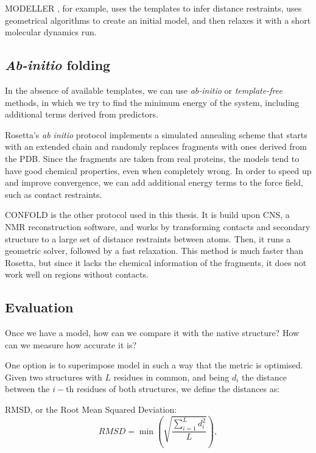 MODELLER \citep{modeller}, for example, uses the templates to infer distance restraints, uses geometrical algorithms to create an initial model, and then relaxes it with a short molecular dynamics run.


\subsection{\emph{Ab-initio} folding}
In the absence of available templates, we can use \emph{ab-initio} or \emph{template-free} methods, in which we try to find the minimum energy of the system, including additional terms derived from predictors.

Rosetta's \citep{Rosetta3}  \emph{ab initio} protocol implements a simulated annealing scheme that starts with an extended chain and randomly replaces fragments with ones derived from the PDB.
Since the fragments are taken from real proteins, the models tend to have good chemical properties, even when completely wrong.
In order to speed up and improve convergence, we can add additional energy terms to the force field, such as contact restraints.

CONFOLD \citep{confold}  is the other protocol used in this thesis.
It is build upon CNS, a NMR reconstruction software, and works by transforming contacts and secondary structure to a large set of distance restraints between atoms.
Then, it runs a geometric solver, followed by a fast relaxation.
This method is much faster than Rosetta, but since it lacks the chemical information of the fragments, it does not work well on regions without contacts.


\subsection{Evaluation}
Once we have a model, how can we compare it with the native structure? How can we measure how accurate it is?

One option is to superimpose model 
in such a way that the metric is optimised.
Given two structures with $L$ residues in common, and being $d_i$ the distance between the $i-$th residues of both structures, we define the distances as:

RMSD, or the Root Mean Squared Deviation:
\begin{equation*}
RMSD = \min \left(\sqrt{\frac{\sum_{i=1}^L d_i^2}{L}}\right),
\end{equation*}

